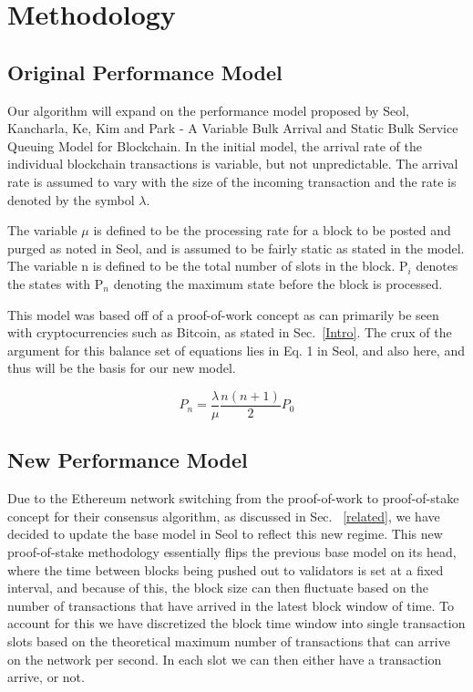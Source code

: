 \documentclass[conference]{IEEEtran}
\begin{document}
\section{Methodology}

\subsection{Original Performance Model}\label{Model}
Our algorithm will expand on the performance model proposed by Seol, Kancharla, Ke, Kim and Park
 - A Variable Bulk Arrival and Static Bulk Service Queuing Model for Blockchain\cite{2020_ACM_Seol}. 
 In the initial model, the arrival rate of the individual blockchain transactions is variable, but not unpredictable. 
 The arrival rate is assumed to vary with the size of the incoming transaction and the rate is 
 denoted by the symbol $\lambda$.

The variable $\mu$ is defined to be the processing rate for a block to be posted and purged as noted 
in Seol\cite{2020_ACM_Seol}, and is assumed to be fairly static as stated in the model. 
The variable n is defined to be the total number of slots in the block. P$_i$ denotes the states with 
P$_n$ denoting the maximum state before the block is processed. 

This model was based off of a proof-of-work concept as can primarily be seen with cryptocurrencies 
such as Bitcoin, as stated in Sec.~\ref{Intro}. The crux of the argument for this balance set of equations 
lies in Eq. 1 in Seol\cite{2020_ACM_Seol}, and also here, and thus will be the basis for our 
new model. 

\begin{equation}
P_n = \frac{\lambda}{\mu}\frac{n(n+1)}{2}P_0\label{om_1}
\end{equation}

\subsection{New Performance Model}\label{new_model}

Due to the Ethereum network switching from the proof-of-work to proof-of-stake 
concept for their consensus algorithm, as discussed in Sec. ~\ref{related}, we have 
decided to update the base model in Seol\cite{2020_ACM_Seol} to reflect this new 
regime. This new proof-of-stake methodology essentially flips the previous base 
model on its head, where the time between blocks being pushed out to validators is 
set at a fixed interval, and because of this, the block size can then fluctuate based 
on the number of transactions that have arrived in the latest block window of time. 
To account for this we have discretized the block time window into single transaction
slots based on the theoretical maximum number of transactions that can arrive on 
the network per second. In each slot we can then either have a transaction arrive, 
or not. 
\end{document}
